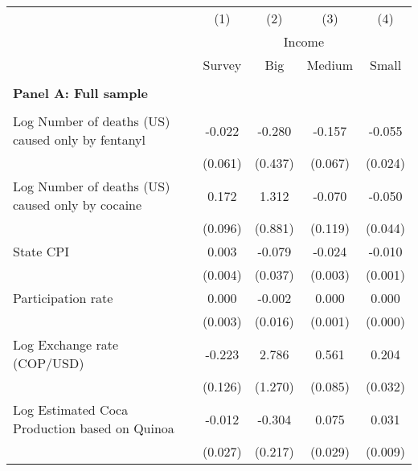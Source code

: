 \begin{tabular}{lcccc} \\ \hline 
                    &\multicolumn{1}{c}{(1)}         &\multicolumn{1}{c}{(2)}         &\multicolumn{1}{c}{(3)}         &\multicolumn{1}{c}{(4)}         \\
 & \multicolumn{4}{c}{Income} \\ \cline{2-5} & Survey  &  \multicolumn{1}{c}{Big} & \multicolumn{1}{c}{Medium}& \multicolumn{1}{c}{Small} \\ \hline   &  &  &  &  \\ \textbf{Panel A: Full sample} \\ & & & & \\
Log Number of deaths (US) caused only by fentanyl&      -0.022         &      -0.280         &      -0.157\sym{*}  &      -0.055\sym{*}  \\
                    &     (0.061)         &     (0.437)         &     (0.067)         &     (0.024)         \\
\addlinespace
Log Number of deaths (US) caused only by cocaine&       0.172         &       1.312         &      -0.070         &      -0.050         \\
                    &     (0.096)         &     (0.881)         &     (0.119)         &     (0.044)         \\
\addlinespace
State CPI           &       0.003         &      -0.079\sym{*}  &      -0.024\sym{***}&      -0.010\sym{***}\\
                    &     (0.004)         &     (0.037)         &     (0.003)         &     (0.001)         \\
\addlinespace
Participation rate  &       0.000         &      -0.002         &       0.000         &       0.000         \\
                    &     (0.003)         &     (0.016)         &     (0.001)         &     (0.000)         \\
\addlinespace
Log Exchange rate (COP/USD)&      -0.223         &       2.786\sym{*}  &       0.561\sym{***}&       0.204\sym{***}\\
                    &     (0.126)         &     (1.270)         &     (0.085)         &     (0.032)         \\
\addlinespace
Log Estimated Coca Production based on Quinoa&      -0.012         &      -0.304         &       0.075\sym{**} &       0.031\sym{**} \\
                    &     (0.027)         &     (0.217)         &     (0.029)         &     (0.009)         \\

\end{tabular}

